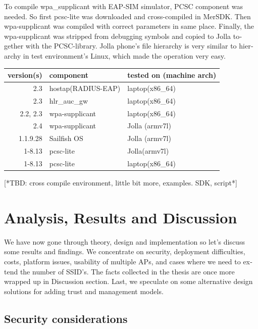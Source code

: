 \documentclass[12pt,a4paper,english]{tutthesis}
\begin{document}
\begin{otherlanguage}{english}
To compile wpa\_supplicant with EAP-SIM simulator, PCSC component was
needed.
So first pcsc-lite was
downloaded and cross-compiled in MerSDK. Then wpa-supplicant was compiled
with correct parameters in same place. Finally, the wpa-supplicant was 
stripped from debugging symbols and copied to Jolla together with the PCSC-library.
Jolla phone's file hierarchy is very similar to hierarchy in test
environment's Linux, which made the operation very easy.



\begin{center}
\begin{tabular}{rll}
version(s) & component & tested on (machine arch)\\
\hline
2.3 & hostap(RADIUS-EAP) & laptop(x86\_64)\\
2.3 & hlr\_auc\_gw & laptop(x86\_64)\\
2.2, 2.3 & wpa-supplicant & laptop(x86\_64)\\
2.4 & wpa-supplicant & Jolla (armv7l)\\
1.1.9.28 & Sailfish OS & Jolla (armv7l)\\
1-8.13 & pcsc-lite & Jolla(armv7l)\\
1-8.13 & pcsc-lite & laptop(x86\_64)\\
\hline
\end{tabular}
\end{center}

[*TBD: cross compile environment, little bit more, examples. SDK,
script*]

\chapter{Analysis, Results and Discussion}
\label{sec-6}

We have now gone through theory, design and implementation so let's
discuss some results and findings. We concentrate on security, 
deployment difficulties, costs, platform issues, usability of multiple
APs, and cases where we
need to extend the number of SSID's. The facts collected in the thesis
are once more wrapped up in Discussion section.
Last, we speculate on some alternative design solutions for adding
trust and management models.


\section{Security considerations}
\label{sec-6-1}




\end{otherlanguage}
\end{document}
